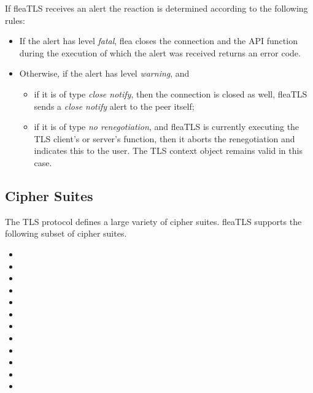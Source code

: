\documentclass[a4paper,11pt]{scrartcl}
\begin{document}
  If fleaTLS receives an alert the reaction is determined according to the
  following rules:
  \begin{itemize}
    \item If the alert has level \emph{fatal}, flea closes the connection and the API
        function during the execution of which the alert was received returns an
        error code.
      \item Otherwise, if the alert has level \emph{warning}, and
        \begin{itemize}
          \item if it is of type \emph{close notify}, then the connection is closed as
            well, \ie fleaTLS sends a \emph{close notify} alert to the peer itself;
          \item if it is of type \emph{no renegotiation}, and fleaTLS is
            currently executing the TLS client's or server's
             function, then it aborts the renegotiation and
            indicates this to the user. The TLS context object remains valid in
            this case.

  \end{itemize}
  \end{itemize}

\subsection{Cipher Suites}

The TLS protocol defines a large variety of cipher suites. fleaTLS
\thisFleaVersion supports the following subset of cipher suites.
\begin{itemize}
  \item {}
  \item {}
  \item {}
  \item {}
  \item {}
  \item {}
  \item {}
  \item {}
  \item {}
  \item {}
  \item {}
  \item {}
\end{itemize}
\end{document}
